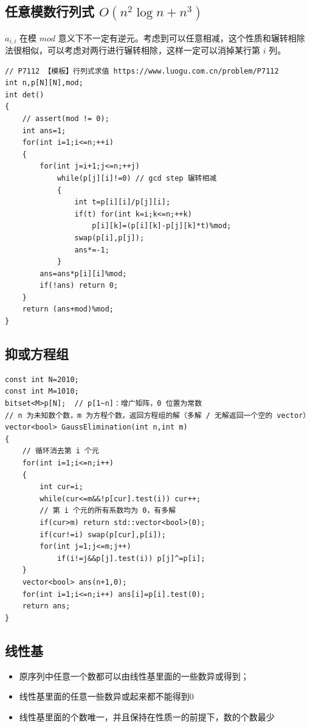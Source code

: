 \subsection{任意模数行列式 $O(n^2\log n + n^3)$ }
\par \noindent  $a_{i,i}$ 在模 $mod$ 意义下不一定有逆元。考虑到可以任意相减，这个性质和辗转相除法很相似，可以考虑对两行进行辗转相除，这样一定可以消掉某行第 $i$ 列。
\begin{verbatim}
// P7112 【模板】行列式求值 https://www.luogu.com.cn/problem/P7112
int n,p[N][N],mod;
int det()
{
    // assert(mod != 0);
    int ans=1;
    for(int i=1;i<=n;++i)
    {
        for(int j=i+1;j<=n;++j)
            while(p[j][i]!=0) // gcd step 辗转相减
            {
                int t=p[i][i]/p[j][i];
                if(t) for(int k=i;k<=n;++k)
                    p[i][k]=(p[i][k]-p[j][k]*t)%mod;
                swap(p[i],p[j]);
                ans*=-1;
            }
        ans=ans*p[i][i]%mod;
        if(!ans) return 0;
    }
    return (ans+mod)%mod;
}
\end{verbatim}
\subsection{抑或方程组}
\begin{verbatim}
const int N=2010;
const int M=1010;
bitset<M>p[N];  // p[1~n]：增广矩阵，0 位置为常数
// n 为未知数个数，m 为方程个数，返回方程组的解（多解 / 无解返回一个空的 vector）
vector<bool> GaussElimination(int n,int m)
{
    // 循环消去第 i 个元
    for(int i=1;i<=n;i++)
    {
        int cur=i;
        while(cur<=m&&!p[cur].test(i)) cur++;
        // 第 i 个元的所有系数均为 0，有多解
        if(cur>m) return std::vector<bool>(0);
        if(cur!=i) swap(p[cur],p[i]);
        for(int j=1;j<=m;j++)
            if(i!=j&&p[j].test(i)) p[j]^=p[i];
    }
    vector<bool> ans(n+1,0);
    for(int i=1;i<=n;i++) ans[i]=p[i].test(0);
    return ans;
}
\end{verbatim}
\subsection{线性基}
\begin{itemize}
\item 原序列中任意一个数都可以由线性基里面的一些数异或得到；

\item 线性基里面的任意一些数异或起来都不能得到0

\item 线性基里面的个数唯一，并且保持在性质一的前提下，数的个数最少
\end{itemize}

